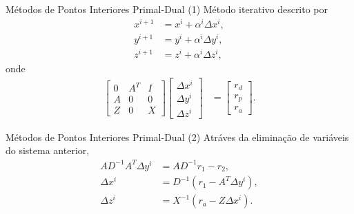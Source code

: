 \documentclass[10pt]{beamer}
\begin{document}
\begin{frame}{Métodos de Pontos Interiores Primal-Dual (1)}
  Método iterativo descrito por
  \begin{align*}
      x^{i + 1} &= x^i + \alpha^i \Delta x^i, \\
      y^{i + 1} &= y^i + \alpha^i \Delta y^i, \\
      z^{i + 1} &= z^i + \alpha^i \Delta z^i,
  \end{align*}
  onde
  \begin{align*}
      \begin{bmatrix}
           0 & A^T & I \\
           A & 0 & 0 \\
           Z & 0 & X
       \end{bmatrix} \begin{bmatrix}
           \Delta x^i \\
           \Delta y^i \\
           \Delta z^i
       \end{bmatrix} &= \begin{bmatrix}
           r_d \\
           r_p \\
           r_a
       \end{bmatrix}.
  \end{align*}
\end{frame}

\begin{frame}{Métodos de Pontos Interiores Primal-Dual (2)}
  Atráves da eliminação de variáveis do sistema anterior,
  \begin{align*}
      A D^{-1} A^T \Delta y^i &= A D^{-1} r_1 - r_2, \\
      \Delta x^i &= D^{-1} \left( r_1 - A^T \Delta y^i \right), \\
      \Delta z^i &= X^{-1} \left( r_a - Z \Delta x^i \right).
  \end{align*}
\end{frame}
\end{document}
